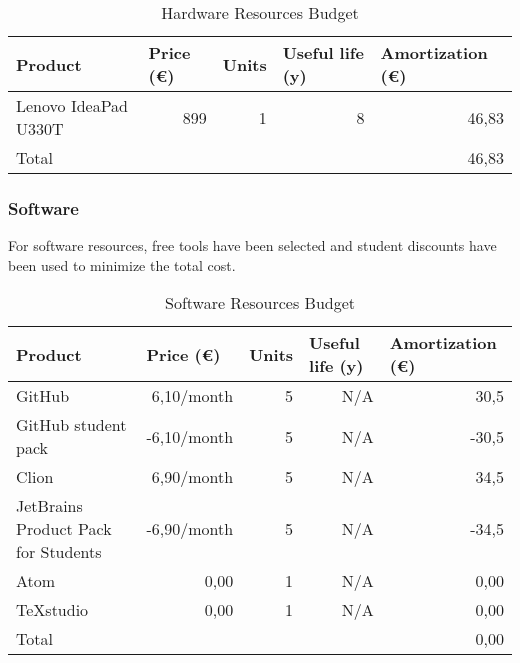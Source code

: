 \begin{table}[h!]
	\centering
	\begin{tabular}{|l|r|r|r|r|}
		\hline
		Product & \multicolumn{1}{l|}{Price (€)} & \multicolumn{1}{l|}{Units} & \multicolumn{1}{l|}{Useful life (y)} & \multicolumn{1}{l|}{Amortization (€)} \\ \hline
		Lenovo IdeaPad U330T & 899 & 1 & 8 & 46,83\\ \hline\hline
		Total & \multicolumn{4}{r|}{46,83} \\ \hline
	\end{tabular}
	\caption{Hardware Resources Budget}
	\label{HardwareResources}
\end{table}

\subsubsection{Software}
For software resources, free tools have been selected and student discounts have been used to minimize the total cost.
\begin{table}[h!]
	\centering
	\begin{tabular}{|l|r|r|r|r|}
		\hline
		Product              & \multicolumn{1}{l|}{Price (€)} & \multicolumn{1}{l|}{Units} & \multicolumn{1}{l|}{Useful life (y)} & \multicolumn{1}{l|}{Amortization (€)} \\ \hline
		GitHub	& 6,10/month & 5 & N/A & 30,5 \\ \hline
		GitHub student pack & -6,10/month & 5 & N/A & -30,5 \\ \hline
		Clion 	& 6,90/month & 5 & N/A & 34,5 \\ \hline
		JetBrains Product Pack for Students & -6,90/month & 5 & N/A & -34,5 \\ \hline
		Atom 	& 0,00 & 1 & N/A & 0,00 \\ \hline
		TeXstudio 	& 0,00 & 1 & N/A & 0,00 \\ \hline\hline
		Total	& \multicolumn{4}{r|}{0,00}                                                                                           \\ \hline
	\end{tabular}
	\caption{Software Resources Budget}
	\label{SoftwareResources}
\end{table}

